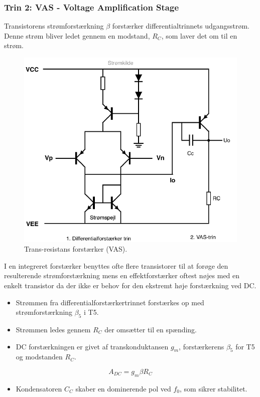 \documentclass[danish]{article}
\begin{document}
\newpage 
\subsubsection{Trin 2: VAS - Voltage Amplification Stage} 
Transistorens strømforstærkning $\beta$ forstærker differentialtrinnets udgangsstrøm. Denne strøm bliver ledet gennem en modstand, $R_C$, som laver det om til en strøm. 

\begin{figure} [H]
	\centering
	\includegraphics[width=0.7\linewidth]{graphics/vas}
	\caption{Trans-resistans forstærker (VAS).}
	\label{fig:VAS_forstærker}
\end{figure}

I en integreret forstærker benyttes ofte flere transistorer til at forøge den resulterende strømforstærkning mens en effektforstærker oftest nøjes med en enkelt transistor da der ikke er behov for den ekstremt høje forstærkning ved DC. 

\begin{itemize}
	\item Strømmen fra differentialforstærkertrinnet forstærkes op med strømforstærkning $\beta_5$ i T5.
	\item Strømmen ledes gennem $R_C$ der omsætter til en spænding.
	\item DC forstærkningen er givet af transkonduktansen $g_m$, forstærkerens $\beta_5$ for T5 og modstanden $R_C$.
\end{itemize}

\begin{equation} 
A_{DC} = g_m \beta R_C
\end{equation}

\begin{itemize}
	\item Kondensatoren $C_C$ skaber en dominerende pol ved $f_0$, som sikrer stabilitet.
\end{itemize}
\end{document}
